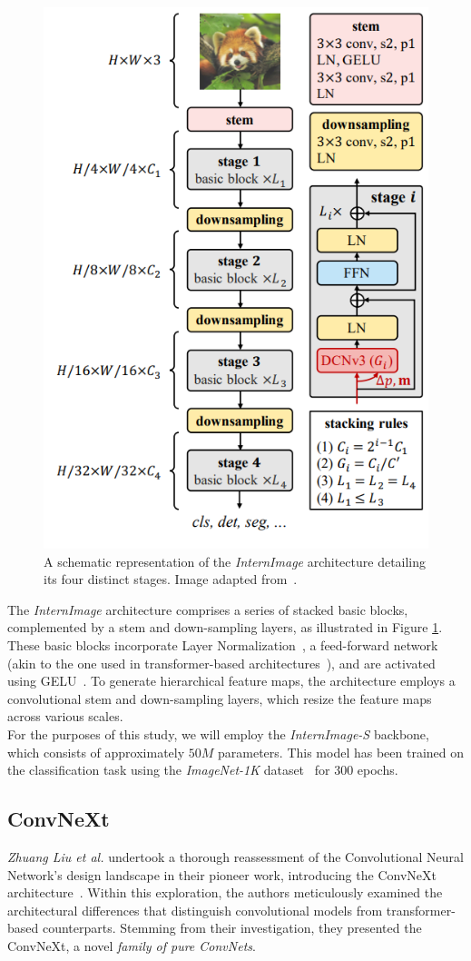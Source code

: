 \begin{figure}[htb]
    \centering
    \includegraphics[width=0.6\linewidth]{figures/chapters-imgs/30/internimage-arq.png}
    \caption[\textit{InternImage} architecture]{A schematic representation of the \textit{InternImage} architecture detailing its four distinct stages. Image adapted from~\cite{wang2023internimage}.}
    \label{fig:internimage-arq}
\end{figure}

The \textit{InternImage} architecture comprises a series of stacked basic blocks, complemented by a stem and down-sampling layers, as illustrated in Figure \ref{fig:internimage-arq}. These basic blocks incorporate Layer Normalization~\cite{ba2016layer}, a feed-forward network (akin to the one used in transformer-based architectures~\cite{vaswani2023attention}), and are activated using GELU~\cite{hendrycks2023gaussian}. To generate hierarchical feature maps, the architecture employs a convolutional stem and down-sampling layers, which resize the feature maps across various scales.\\

For the purposes of this study, we will employ the \textit{InternImage-S} backbone, which consists of approximately $50M$ parameters. This model has been trained on the classification task using the \textit{ImageNet-1K} dataset~\cite{5206848} for 300 epochs.

\subsection{ConvNeXt} \label{sec:rw:convnext}
\textit{Zhuang Liu et al.} undertook a thorough reassessment of the Convolutional Neural Network's design landscape in their pioneer work, introducing the ConvNeXt architecture~\cite{liu2022convnet}. Within this exploration, the authors meticulously examined the architectural differences that distinguish convolutional models from transformer-based counterparts. Stemming from their investigation, they presented the ConvNeXt, a novel \textit{family of pure ConvNets}.\\

